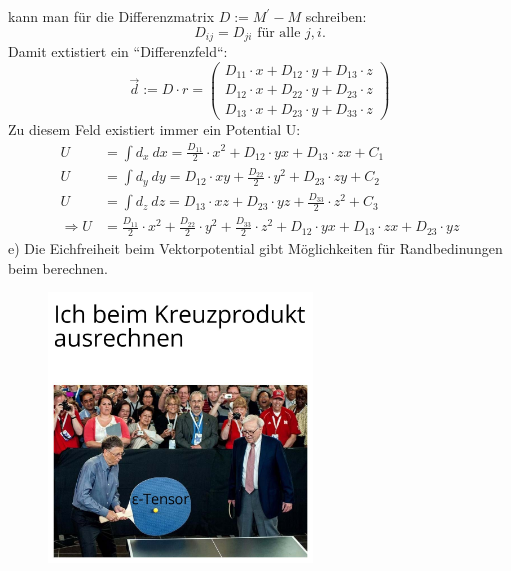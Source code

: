 \documentclass[11pt a4paper]{article}
\begin{document}
kann man für die Differenzmatrix $D := M^\prime - M$ schreiben:
\[
	D_{ij} = D_{ji} \text{ für alle } j,i.
\]
Damit extistiert ein ``Differenzfeld``:
\[
	\vec d := D \cdot r =
	\begin{pmatrix}
		D_{11} \cdot x + D_{12} \cdot y + D_{13} \cdot z \\
		D_{12} \cdot x + D_{22} \cdot y + D_{23} \cdot z \\
		D_{13} \cdot x + D_{23} \cdot y + D_{33} \cdot z
	\end{pmatrix}
\]
Zu diesem Feld existiert immer ein Potential U:
\begin{align*}
	U &= \int d_x \ dx =
	\frac{D_{11}}2 \cdot x^2 + D_{12} \cdot yx + D_{13} \cdot zx + C_1 
\\
	U &= \int d_y \ dy =
	D_{12} \cdot xy + \frac{D_{22}}2 \cdot y^2 + D_{23} \cdot zy + C_2
\\
	U &= \int d_z \ dz =
	D_{13} \cdot xz + D_{23} \cdot yz + \frac{D_{33}}2 \cdot z^2 + C_3
\\
\Rightarrow
	U &= \frac{D_{11}}2 \cdot x^2 + \frac{D_{22}}2 \cdot y^2 
	+ \frac{D_{33}}2 \cdot z^2 + D_{12} \cdot yx + D_{13} \cdot zx
	+ D_{23} \cdot yz
\end{align*}
\vspace{0.5cm}
e) Die Eichfreiheit beim Vektorpotential gibt Möglichkeiten für 
Randbedinungen beim berechnen.
\begin{figure}[H]
	\centering
	\includegraphics[width=7cm]{aufgabe4_meme.jpg}
\end{figure}

\newpage
\end{document}
